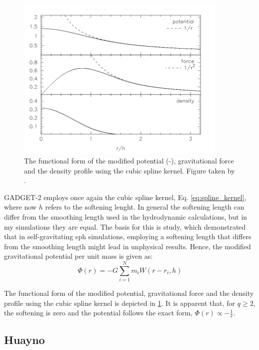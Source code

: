 \begin{figure}[H]
    \centering
    \includegraphics[width=0.9\textwidth]{Thesis/figures/smoothening.pdf}
    \caption{The functional form of the modified potential (-), gravitational force and the density profile using the cubic spline kernel. Figure taken by \cite{price2007energy}.}
    \label{fig:smoothened_gravity}
\end{figure}

GADGET-2 employs once again the cubic spline kernel, Eq. \eqref{eq:spline_kernel}, where now $h$ refers to the softening lenght. In general the softening length can differ from the smoothing length used in the hydrodynamic calculations, but in my simulations they are equal. The basis for this is \cite{bate1997resolution} study, which demonstrated that in self-gravitating \ac{sph} simulations, employing a softening length that differs from the smoothing length might lead in unphysical results. Hence, the modified gravitational potential per unit mass is given as:
\begin{equation}\label{eq:softened_gravity}
   \Phi(r) = -G\sum_{i=1}^{N} m_i W(r-r_i,h)
\end{equation}


The functional form of the modified potential, gravitational force and the density profile using the cubic spline kernel is depicted in \cref{fig:smoothened_gravity}. It is apparent that, for $q \geq 2$, the softening is zero and the potential follows the exact form, $\Phi(r) \propto -\frac{1}{r}$. 

\subsection{Huayno}\label{sub:huayano}

